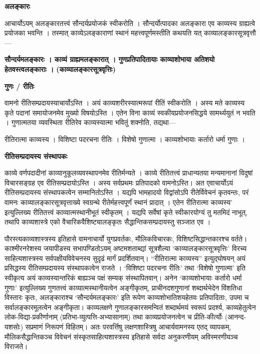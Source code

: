 \documentclass[10pt, a5paper, twoside]{article}
\newcommand{\customparagraph}[1]{
    \noindent \textbf{#1} \par
    \penalty 10000 %
    \vspace{0.1cm plus 0.05cm minus 0.02cm}
    \penalty 10000 %
}
\begin{document}
\customparagraph{\textbf{अलङ्कारः}}

आचार्योऽयम् अलङ्कारतत्त्वं सौन्दर्यप्रयोजकं स्वीकरोति । सौन्दर्योत्पादका अलङ्कारा एव काव्यस्य ग्राह्यत्वे प्रयोजका भवन्ति । तस्मात् काव्येऽलङ्काराणां स्थानं महत्त्वपूर्णमस्तीति कथयति यत् काव्यालङ्कारसूत्रवृत्तौ—

\textbf{सौन्दर्यमलङ्कारः । काव्यं ग्राह्यमलङ्कारात् । गुणप्रतिपादितायाः काव्याशोभाया अतिशयो हेतवस्त्वलङ्काराः ।} \textbf{(काव्यालङ्कारसूत्रवृत्तिः)}

\customparagraph{\textbf{गुणः / रीतिः}}

वामनो रीतिसम्प्रदायस्याचार्योऽस्ति । अयं काव्यशरीरस्यात्मरूपां रीतिं स्वीकरोति । अस्य मते काव्यस्य कृते पदानां समायोजनमेव मुख्यो विषयोऽस्ति । एतेन विना काव्यं स्वकीयप्रयोजनसिद्धये सामर्थ्ययुतं न भवति । गुणात्मतया व्यवस्थिता रीतिरेव काव्यस्यात्मा भवितुं शक्नोति, तद्यथा—

रीतिरात्मा काव्यस्य । विशिष्टा पदरचना रीतिः । विशेषो गुणात्मा । काव्यशोभायाः कर्तारो धर्मा गुणाः ।

\customparagraph{\textbf{रीतिसम्प्रदायस्य संस्थापकः}}

काव्ये वर्णपदादीनां काव्यानुकूलव्यवस्थापनमेव रीतिर्मन्यते । काव्ये रीतितत्त्वं प्राधान्यतया मन्यमानानां विदुषां विचारसङ्ग्रह एव रीतिसम्प्रदायोऽस्ति । अस्य सर्वप्रथमः प्रतिपादको वामनोऽस्ति। अत एवाचार्योऽयं रीतिसम्प्रदायस्य संस्थापकत्वेन सम्मानितोऽस्ति । यद्यपि भामहादयो विद्वांसोऽपि रीतेर्विवेचनं कृतवन्तः, परं वामनः काव्यालङ्कारसूत्रवृत्ताख्ये स्वग्रन्थे रीतेर्महत्त्वपूर्णं स्थानं प्रादात् । एतेन रीतिरात्मा काव्यस्य’ इत्युल्लिख्य रीतितत्त्वं काव्यात्मस्थानीभूतं स्वीकृतम् । यद्यपि सर्वेषां कृते स्वीकारयोग्यं तु मतमिदं नाभूत्, तथापि काव्यशास्त्रे एको वैचारिकवैशिष्ट्यालङ्कृतः सैद्धान्तिकसम्प्रदायस्तु सञ्जात एव ।

पौरस्त्यकाव्यशास्त्रस्य इतिहासे वामनाचार्यो युगप्रवर्तकः, मौलिकविचारकः, विशिष्टसिद्धान्तकारश्च वर्तते। काश्मीरनरेशस्य जयापीडस्य सभापण्डितोऽयम् अष्टमशताब्द्यां सूत्रशैल्या ‘काव्यालङ्कारसूत्रवृत्तिः’ विरच्य साहित्यशास्त्रस्य सर्वपक्षीयविवेचनस्य सुदृढं मार्गं प्रदर्शितवान्। “रीतिरात्मा काव्यस्य” इत्युद्‌घोषयन् अयं प्रसिद्धस्य रीतिसम्प्रदायस्य संस्थापकत्वेन राजते । ‘विशिष्टा पदरचना रीतिः’ तथा ‘विशेषो गुणात्मा’ इति स्वीकृत्य अयं काव्यस्यान्तरिकं बाह्यञ्च पक्षं सम्यक् संस्थापितवान्। अनेन ‘काव्यशोभायाः कर्तारो धर्मा गुणाः’ इत्युल्लिख्य गुणतत्त्वं काव्यात्मस्थानीयत्वेन अङ्गीकृतम्, प्राचीनदशगुणानां शब्दार्थभेदेन विंशतिधा विस्तारः कृतः, अलङ्काराश्च ‘सौन्दर्यमलङ्कारः’ इति रूपेण काव्यशोभातिशयहेतवः प्रतिपादिताः, उपमा च सर्वालङ्कारमूलत्वेन अङ्गीकृता। काव्यलक्षणे गुणालङ्कारसमन्वितं शब्दार्थमयं स्वरूपं प्रदर्श्य, काव्यहेतुत्वेन लोक-विद्या-प्रकीर्णानाम् (प्रतिभा-व्युत्पत्ति-अभ्यासानाम्) तथा काव्यप्रयोजनत्वेन च प्रीति-कीर्त्योः (आनन्द-यशसोः) सप्रमाणं निरूपणं विहितम्। अतः परवर्त्तिषु लक्षणशास्त्रिषु आचार्यवामनस्य एतद् व्यापकम्, मौलिकसैद्धान्तिकञ्च विवेचनं संस्कृतसाहित्यशास्त्रस्य इतिहासे सर्वदा अनुकरणीयम् अविस्मरणीयञ्च विराजते।
\end{document}
